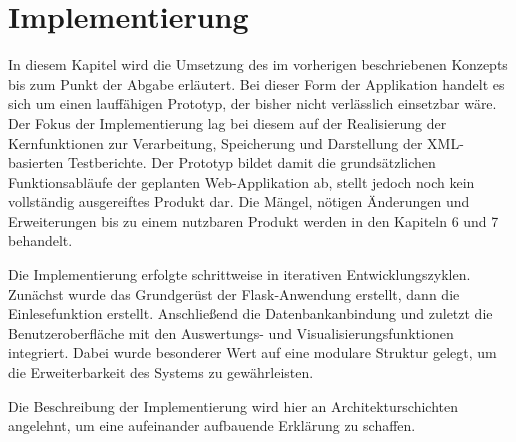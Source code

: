 \section{Implementierung}
\label{sec:implementierung}


In diesem Kapitel wird die Umsetzung des im vorherigen beschriebenen Konzepts bis zum Punkt der Abgabe erläutert.
Bei dieser Form der Applikation handelt es sich um einen lauffähigen Prototyp, der bisher nicht verlässlich einsetzbar wäre.
Der Fokus der Implementierung lag bei diesem auf der Realisierung der Kernfunktionen zur Verarbeitung, Speicherung und Darstellung der XML-basierten Testberichte.
Der Prototyp bildet damit die grundsätzlichen Funktionsabläufe der geplanten Web-Applikation ab, stellt jedoch noch kein vollständig ausgereiftes Produkt dar.
Die Mängel, nötigen Änderungen und Erweiterungen bis zu einem nutzbaren Produkt werden in den Kapiteln 6 und 7 behandelt.

Die Implementierung erfolgte schrittweise in iterativen Entwicklungszyklen.
Zunächst wurde das Grundgerüst der Flask-Anwendung erstellt, dann die Einlesefunktion erstellt.
Anschließend die Datenbankanbindung und zuletzt die Benutzeroberfläche mit den Auswertungs- und Visualisierungsfunktionen integriert.
Dabei wurde besonderer Wert auf eine modulare Struktur gelegt, um die Erweiterbarkeit des Systems zu gewährleisten.

Die Beschreibung der Implementierung wird hier an Architekturschichten angelehnt, um eine aufeinander aufbauende Erklärung zu schaffen.






